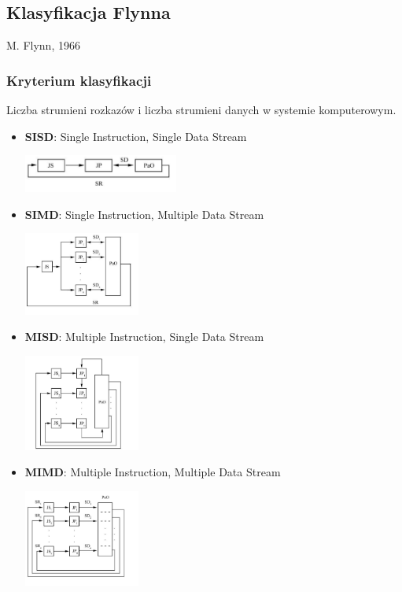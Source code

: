 	\subsection{Klasyfikacja Flynna}
		\begin{samepage}
		M. Flynn, 1966
		\subsubsection{Kryterium klasyfikacji}
			Liczba strumieni rozkazów i liczba strumieni danych w systemie komputerowym.
		
			\begin{itemize}
				\item \textbf{SISD}: Single Instruction, Single Data Stream
				\begin{center}
					\includegraphics[width=0.4\textwidth]{./images/Flynn01}
				\end{center}
				\item \textbf{SIMD}: Single Instruction, Multiple Data Stream
				\begin{center}
					\includegraphics[width=0.3\textwidth]{./images/Flynn02}
				\end{center}
				\item \textbf{MISD}: Multiple Instruction, Single Data Stream
				\begin{center}
					\includegraphics[width=0.3\textwidth]{./images/Flynn03}
				\end{center}
				\item \textbf{MIMD}: Multiple Instruction, Multiple Data Stream
				\begin{center}
					\includegraphics[width=0.3\textwidth]{./images/Flynn04}

\end{center}
\end{itemize}
\end{samepage}

